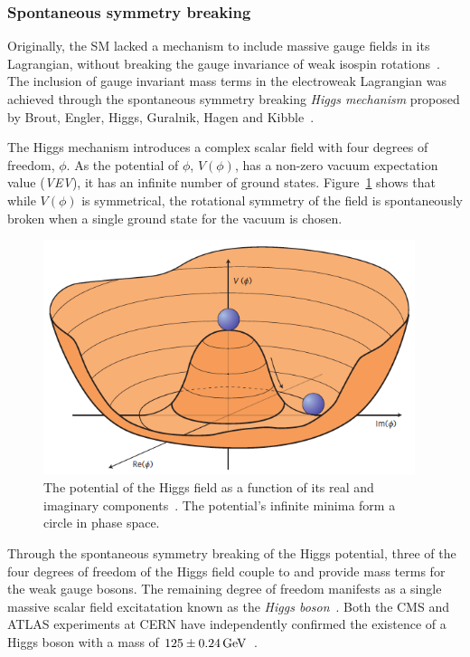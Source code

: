 \subsubsection{Spontaneous symmetry breaking}\label{subsec:higgs}
Originally, the SM lacked a mechanism to include massive gauge fields in its Lagrangian, without breaking the gauge invariance of weak isospin rotations~\cite{Griffiths}.
The inclusion of gauge invariant mass terms in the electroweak Lagrangian was achieved through the spontaneous symmetry breaking \emph{Higgs mechanism} proposed by Brout, Engler, Higgs, Guralnik, Hagen and Kibble~\cite{Englert:1964et,Higgs:1964pj,Guralnik:1964eu}.

The Higgs mechanism introduces a complex scalar field with four degrees of freedom, $\phi$.
As the potential of $\phi$, $V(\phi)$, has a non-zero vacuum expectation value (\textit{VEV}), it has an infinite number of ground states.
Figure~\ref{fig:higgsPotential} shows that while $V(\phi)$ is symmetrical, the rotational symmetry of the field is spontaneously broken when a single ground state for the vacuum is chosen.

\begin{figure}[htbp]
\begin{center}
\includegraphics[width=0.97\textwidth]{figs/sm/higgspotential.png}
\caption{The potential of the Higgs field as a function of its real and imaginary components~\cite{Ellis:2013jnq}. The potential's infinite minima form a circle in phase space.}
\label{fig:higgsPotential}
\end{center}
\end{figure}

Through the spontaneous symmetry breaking of the Higgs potential, three of the four degrees of freedom of the Higgs field couple to and provide mass terms for the weak gauge bosons.
The remaining degree of freedom manifests as a single massive scalar field excitatation known as the \emph{Higgs boson}~\cite{Cheng:1985bj}.
Both the CMS and ATLAS experiments at CERN have independently confirmed the existence of a Higgs boson with a mass of $125 \pm 0.24 \,\text{Ge\hspace{-.08em}V}$~\cite{HiggsCMS,HiggsATLAS}. 


